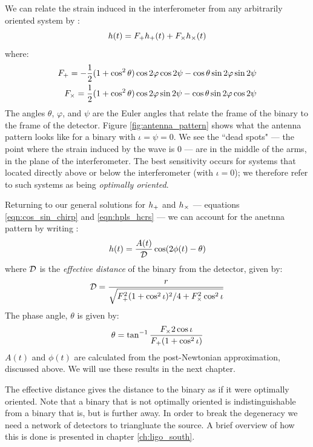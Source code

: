 We can relate the strain induced in the interferometer from any arbitrarily oriented system by \cite{ref:?}:
\begin{equation}
h(t) = F_{+} h_{+}(t) + F_{\times} h_{\times}(t)
\end{equation}
where:
\begin{align}
F_{+} = -\frac{1}{2} (1 + \cos^2 \theta)\cos 2\varphi \cos 2\psi - \cos\theta \sin2\varphi \sin 2\psi \\
F_{\times} = \frac{1}{2}(1 + \cos^2 \theta)\cos 2\varphi \sin2\psi - \cos\theta \sin2\varphi \cos 2\psi
\end{align}
The angles $\theta$, $\varphi$, and $\psi$ are the Euler angles that relate the frame of the binary to the frame of the detector. Figure \ref{fig:antenna_pattern} shows what the antenna pattern looks like for a binary with $\iota = \psi = 0$. We see the ``dead spots" --- the point where the strain induced by the wave is $0$ --- are in the middle of the arms, in the plane of the interferometer. The best sensitivity occurs for systems that located directly above or below the interferometer (with $\iota = 0$); we therefore refer to such systems as being \emph{optimally oriented}.

Returning to our general solutions for $h_{+}$ and $h_{\times}$ --- equations \ref{eqn:cos_sin_chirp} and \ref{eqn:hpls_hcrs} --- we can account for the anetnna pattern by writing \cite{ref:Brown}:
\begin{equation}
h(t) = \frac{A(t)}{\mathcal{D}} \cos(2\phi(t) - \theta)
\end{equation}
where $\mathcal{D}$ is the \emph{effective distance} of the binary from the detector, given by:
\begin{equation}
\mathcal{D} = \frac{r}{\sqrt{ F_{+}^2(1 + \cos^2\iota)^2/4 + F_{\times}^2\cos^2 \iota}}
\end{equation}
The phase angle, $\theta$ is given by:
\begin{equation}
\theta = \tan^{-1} \frac{F_{\times} 2\cos \iota}{F_{+}(1 + \cos^2 \iota)}
\end{equation}
$A(t)$ and $\phi(t)$ are calculated from the post-Newtonian approximation, discussed above. We will use these results in the next chapter.

The effective distance gives the distance to the binary as if it were optimally oriented. Note that a binary that is not optimally oriented is indistinguishable from a binary that is, but is further away. In order to break the degeneracy we need a network of detectors to triangluate the source. A brief overview of how this is done is presented in chapter \ref{ch:ligo_south}.

